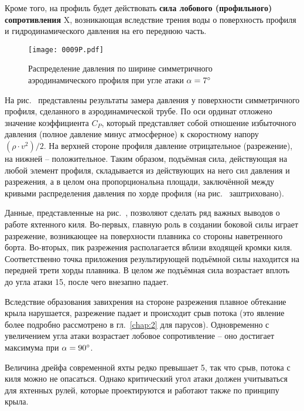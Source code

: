 Кроме того, на профиль будет действовать \textbf{сила лобового (профильного) сопротивления}
\ve X, возникающая вследствие трения
воды о поверхность профиля и гидродинамического давления на его
переднюю часть.

\begin{figure}[!htb]
  \centering
  \texttt{[image: 0009P.pdf]}
  \caption[Распределение давления по ширине симметричного
  аэродинамического профиля]{Распределение давления по ширине
    симметричного аэродинамического профиля при угле атаки
    $\alpha = 7^\circ$}
  \label{fig:9}
\end{figure}

На рис.~ представлены результаты замера давления у поверхности
симметричного профиля, сделанного в аэродинамической трубе. По оси
ординат отложено значение коэффициента $C_P$, который представляет
собой отношение избыточного давления (полное давление минус
атмосферное) к скоростному напору $(\rho \cdot v^2) / 2$. На верхней
стороне профиля давление отрицательное (разрежение), на нижней \---
положительное. Таким образом, подъёмная сила, действующая на любой
элемент профиля, складывается из действующих на него сил давления и
разрежения, а в целом она пропорциональна площади, заключённой между
кривыми распределения давления по хорде профиля (на рис.~
заштриховано).

Данные, представленные на рис.~, позволяют сделать ряд важных
выводов о работе яхтенного киля. Во-первых, главную роль в создании
боковой силы играет разрежение, возникающее на поверхности плавника со
стороны наветренного борта. Во-вторых, пик разрежения располагается
вблизи входящей кромки киля. Соответственно точка приложения
результирующей подъёмной силы находится на передней трети хорды
плавника. В целом же подъёмная сила возрастает вплоть до угла атаки
15\gr, после чего внезапно падает.

Вследствие образования завихрения на стороне разрежения плавное
обтекание крыла нарушается, разрежение падает и происходит срыв потока
(это явление более подробно рассмотрено в гл.~\ref{chap:2} для
парусов). Одновременно с увеличением угла атаки возрастает лобовое
сопротивление \--- оно достигает максимума при $\alpha = 90^\circ$.

Величина дрейфа современной яхты редко превышает 5\gr, так что срыв,
потока с киля можно не опасаться. Однако критический угол атаки должен
учитываться для яхтенных рулей, которые проектируются и работают также
по принципу крыла.

